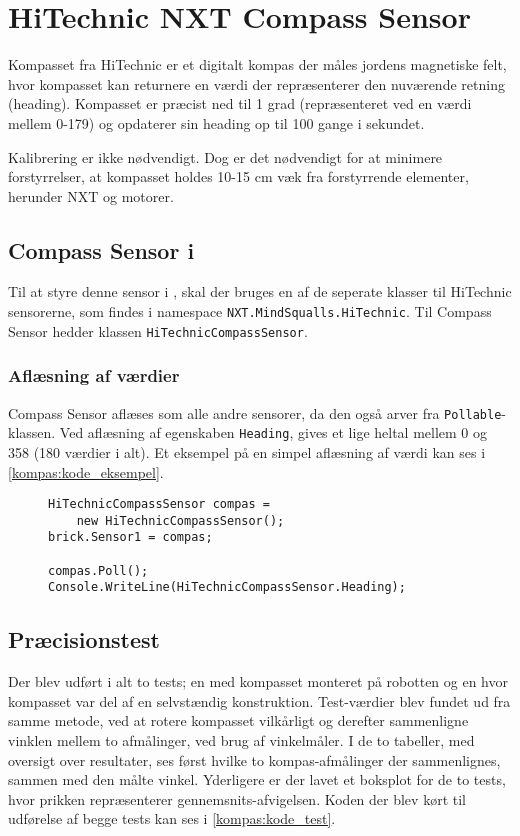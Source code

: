 \section{HiTechnic NXT Compass Sensor}
Kompasset fra HiTechnic er et digitalt kompas der måles jordens magnetiske felt, hvor kompasset kan returnere en værdi der repræsenterer den nuværende retning (heading).
Kompasset er præcist ned til 1 grad (repræsenteret ved en værdi mellem 0-179) og opdaterer sin heading op til 100 gange i sekundet.

Kalibrering er ikke nødvendigt.
Dog er det nødvendigt for at minimere forstyrrelser, at kompasset holdes 10-15 cm væk fra forstyrrende elementer, herunder \lego NXT og motorer.\cite{hitechnic_compass}

\subsection{Compass Sensor i \mindsqualls}
Til at styre denne sensor i \mindsqualls, skal der bruges en af de seperate klasser til HiTechnic sensorerne, som findes i namespace \lstinline[style=csharp]!NXT.MindSqualls.HiTechnic!.
Til Compass Sensor hedder klassen \lstinline[style=csharp]!HiTechnicCompassSensor!.

\subsubsection{Aflæsning af værdier}
Compass Sensor aflæses som alle andre sensorer, da den også arver fra \lstinline[style=csharp]!Pollable!-klassen.
Ved aflæsning af egenskaben \lstinline[style=csharp]!Heading!, gives et lige heltal mellem 0 og 358 (180 værdier i alt).
Et eksempel på en simpel aflæsning af værdi kan ses i \cref{kompas:kode_eksempel}.

\begin{figure}[h]
\begin{lstlisting}[style=csharpsmall,caption={Et eksempel på brug af Compass Sensor},label=kompas:kode_eksempel,frame=single]
HiTechnicCompassSensor compas =
	new HiTechnicCompassSensor();
brick.Sensor1 = compas;

compas.Poll();
Console.WriteLine(HiTechnicCompassSensor.Heading);
\end{lstlisting}
\end{figure}

\subsection{Præcisionstest}
Der blev udført i alt to tests; en med kompasset monteret på robotten og en hvor kompasset var del af en selvstændig konstruktion.
Test-værdier blev fundet ud fra samme metode, ved at rotere kompasset vilkårligt og derefter sammenligne vinklen mellem to afmålinger, ved brug af vinkelmåler.
I de to tabeller, med oversigt over resultater, ses først hvilke to kompas-afmålinger der sammenlignes, sammen med den målte vinkel.
Yderligere er der lavet et boksplot for de to tests, hvor prikken repræsenterer gennemsnits-afvigelsen.
Koden der blev kørt til udførelse af begge tests kan ses i \cref{kompas:kode_test}.

